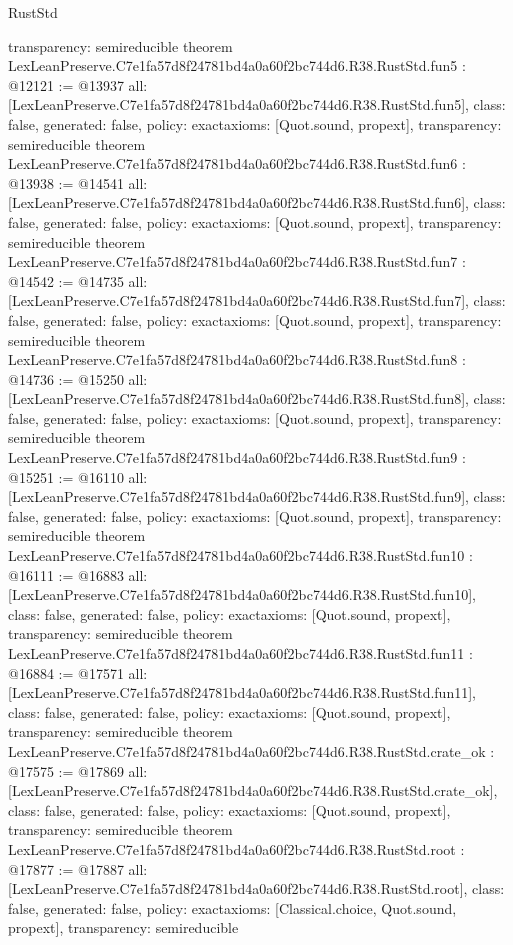 \begin{lexlean}{RustStd}
\begin{coremodule}
{  transparency: semireducible
}
theorem LexLeanPreserve.C7e1fa57d8f24781bd4a0a60f2bc744d6.R38.RustStd.fun5 : @12121 := @13937 {
  all: [LexLeanPreserve.C7e1fa57d8f24781bd4a0a60f2bc744d6.R38.RustStd.fun5],
  class: false,
  generated: false,
  policy: exact{axioms: [Quot.sound, propext]},
  transparency: semireducible
}
theorem LexLeanPreserve.C7e1fa57d8f24781bd4a0a60f2bc744d6.R38.RustStd.fun6 : @13938 := @14541 {
  all: [LexLeanPreserve.C7e1fa57d8f24781bd4a0a60f2bc744d6.R38.RustStd.fun6],
  class: false,
  generated: false,
  policy: exact{axioms: [Quot.sound, propext]},
  transparency: semireducible
}
theorem LexLeanPreserve.C7e1fa57d8f24781bd4a0a60f2bc744d6.R38.RustStd.fun7 : @14542 := @14735 {
  all: [LexLeanPreserve.C7e1fa57d8f24781bd4a0a60f2bc744d6.R38.RustStd.fun7],
  class: false,
  generated: false,
  policy: exact{axioms: [Quot.sound, propext]},
  transparency: semireducible
}
theorem LexLeanPreserve.C7e1fa57d8f24781bd4a0a60f2bc744d6.R38.RustStd.fun8 : @14736 := @15250 {
  all: [LexLeanPreserve.C7e1fa57d8f24781bd4a0a60f2bc744d6.R38.RustStd.fun8],
  class: false,
  generated: false,
  policy: exact{axioms: [Quot.sound, propext]},
  transparency: semireducible
}
theorem LexLeanPreserve.C7e1fa57d8f24781bd4a0a60f2bc744d6.R38.RustStd.fun9 : @15251 := @16110 {
  all: [LexLeanPreserve.C7e1fa57d8f24781bd4a0a60f2bc744d6.R38.RustStd.fun9],
  class: false,
  generated: false,
  policy: exact{axioms: [Quot.sound, propext]},
  transparency: semireducible
}
theorem LexLeanPreserve.C7e1fa57d8f24781bd4a0a60f2bc744d6.R38.RustStd.fun10 : @16111 := @16883 {
  all: [LexLeanPreserve.C7e1fa57d8f24781bd4a0a60f2bc744d6.R38.RustStd.fun10],
  class: false,
  generated: false,
  policy: exact{axioms: [Quot.sound, propext]},
  transparency: semireducible
}
theorem LexLeanPreserve.C7e1fa57d8f24781bd4a0a60f2bc744d6.R38.RustStd.fun11 : @16884 := @17571 {
  all: [LexLeanPreserve.C7e1fa57d8f24781bd4a0a60f2bc744d6.R38.RustStd.fun11],
  class: false,
  generated: false,
  policy: exact{axioms: [Quot.sound, propext]},
  transparency: semireducible
}
theorem LexLeanPreserve.C7e1fa57d8f24781bd4a0a60f2bc744d6.R38.RustStd.crate_ok : @17575 := @17869 {
  all: [LexLeanPreserve.C7e1fa57d8f24781bd4a0a60f2bc744d6.R38.RustStd.crate_ok],
  class: false,
  generated: false,
  policy: exact{axioms: [Quot.sound, propext]},
  transparency: semireducible
}
theorem LexLeanPreserve.C7e1fa57d8f24781bd4a0a60f2bc744d6.R38.RustStd.root : @17877 := @17887 {
  all: [LexLeanPreserve.C7e1fa57d8f24781bd4a0a60f2bc744d6.R38.RustStd.root],
  class: false,
  generated: false,
  policy: exact{axioms: [Classical.choice, Quot.sound, propext]},
  transparency: semireducible
}


\end{coremodule}
\end{lexlean}
